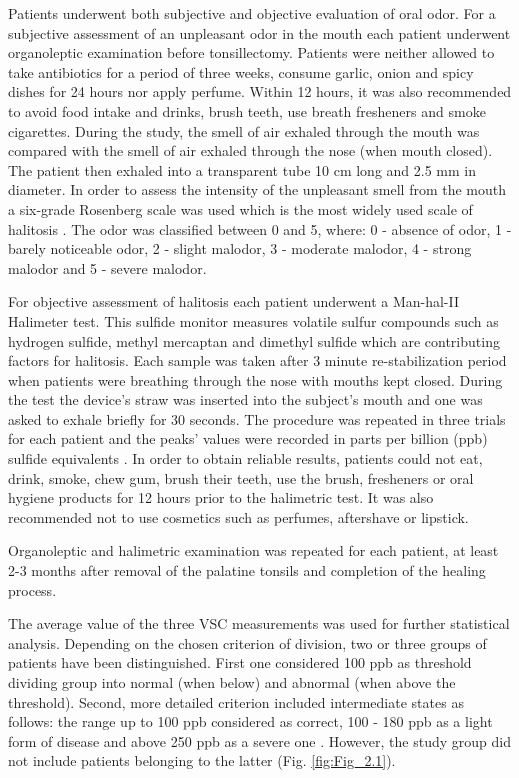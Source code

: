 \documentclass[12pt,a4paper,notitlepage]{report}
\begin{document}
Patients underwent both subjective and objective evaluation of oral odor. 
For a subjective assessment of an unpleasant odor in the mouth each patient underwent organoleptic examination before tonsillectomy. Patients were neither allowed to take antibiotics for a period of three weeks, consume garlic, onion and spicy dishes for 24 hours nor apply perfume. Within 12 hours, it was also recommended to avoid food intake and drinks, brush teeth, use breath fresheners and smoke cigarettes. During the study, the smell of air exhaled through the mouth was compared with the smell of air exhaled through the nose (when mouth closed). The patient then exhaled into a transparent tube 10 cm long and 2.5 mm in diameter. In order to assess the intensity of the unpleasant smell from the mouth a six-grade Rosenberg scale was used which is the most widely used scale of halitosis \cite{Rosenberg92}. The odor was classified between 0 and 5, where: 0 - absence of odor, 1 - barely noticeable odor, 2 - slight malodor, 3 - moderate malodor, 4 - strong malodor and 5 - severe malodor.\

For objective assessment of halitosis each patient underwent a Man-hal-II Halimeter test. This sulfide monitor measures volatile sulfur compounds such as hydrogen sulfide, methyl mercaptan and dimethyl sulfide which are contributing factors for halitosis. Each sample was taken after 3 minute re-stabilization period when patients were breathing through the nose with  mouths kept closed. During the test the device's straw was inserted into the subject’s mouth and one was asked to exhale briefly for 30 seconds. 
The procedure was repeated in three trials for each patient and the peaks' values were recorded in parts per billion (ppb) sulfide equivalents \cite{Alasqah16}.
In order to obtain reliable results, patients could not eat, drink, smoke, chew gum, brush their teeth, use the brush, fresheners or oral hygiene products for 12 hours prior to the halimetric test. It was also recommended not to use cosmetics such as perfumes, aftershave or lipstick. \

Organoleptic and halimetric examination was repeated for each patient, at least 2-3 months after removal of the palatine tonsils and completion of the healing process.

The average value of the three VSC measurements was used for further statistical analysis. Depending on the chosen criterion of division, two or three groups of patients have been distinguished. First one considered 100 ppb as threshold dividing group into normal (when below) and abnormal (when above the threshold). Second, more detailed criterion included intermediate states as follows: the range up to 100 ppb considered as correct, 100 - 180 ppb as a light form of disease and above 250 ppb as a severe one \cite{Lee04}. However, the study group did not include patients belonging to the latter (Fig. \ref{fig:Fig_2.1}).  
\end{document}

